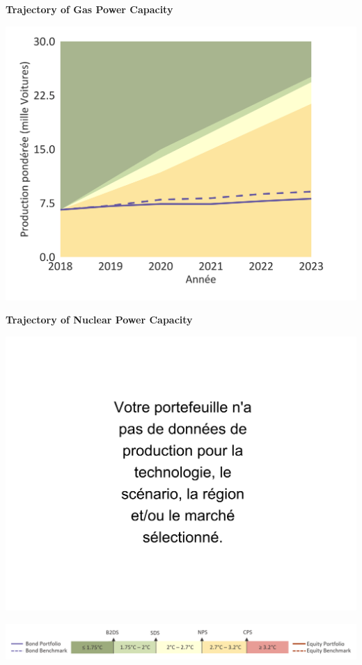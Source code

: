 \documentclass[10pt,table,a4]{article}\usepackage[]{graphicx}\usepackage[]{color}
\begin{document}
	\begin{minipage}[t]{.49\textwidth}
		\textbf{Trajectory of Gas Power Capacity }
		
		\includegraphics[trim = {0 0cm 0 0},width=1\linewidth]{ReportOutputs/Fig16}
		
		\textbf{Trajectory of Nuclear Power Capacity }
		
		\includegraphics[trim = {0 0cm 0 0},width=1\linewidth]{ReportOutputs/Fig17}
		
	\end{minipage}
	
	\vspace{-0.4cm}
	\begin{center}
		\includegraphics[trim = {0 0cm 0 0},width=.9\linewidth]{ReportGraphics/246Legend.png}
	\end{center}
	
\end{document}
